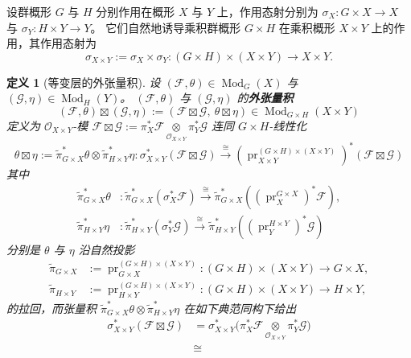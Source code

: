 \documentclass[11pt,a4paper]{article}
\renewcommand{\emph}[1]{{\bfseries #1}}
\DeclareMathOperator{\Mod}{\mathrm{Mod}}
\DeclareMathOperator{\pr}{\operatorname{pr}}
\theoremstyle{cnth}
\newtheorem{defn}[thm]{定义}
\begin{document}
设群概形 $G$ 与 $H$ 分别作用在概形 $X$ 与 $Y$ 上，作用态射分别为
$\sigma_X : G \times X \rightarrow X$
与
$\sigma_Y : H \times Y \rightarrow Y$。
它们自然地诱导乘积群概形 $G\times H$ 在乘积概形 $X\times Y$ 上的作用，其作用态射为
$$
\sigma_{X\times Y}
:=
\sigma_X\times \sigma_Y
:
(G\times H)\times (X\times Y)
\rightarrow
X\times Y.
$$
\begin{defn}[等变层的外张量积]
\label{defn:ExternalTensorProductOfEquivariantModules}
设 $(\mathcal{F},\theta)\in\Mod_G(X)$ 与
$(\mathcal{G},\eta)\in\Mod_H(Y)$。
$(\mathcal{F},\theta)$ 与 $(\mathcal{G},\eta)$ 的\emph{外张量积}
$$
(\mathcal{F},\theta)\boxtimes(\mathcal{G},\eta)
:=
\left(
\mathcal{F}\boxtimes\mathcal{G},
\
\theta\boxtimes\eta
\right)
\in\Mod_{G\times H}(X\times Y)
$$
定义为 $\mathcal{O}_{X\times Y}$-模
$
\mathcal{F}\boxtimes\mathcal{G}
:=
\pi_X^*\mathcal{F}
\underset{\mathcal{O}_{X\times Y}}{\otimes}
\pi_Y^*\mathcal{G}
$
连同 $G\times H$-线性化
$$
\theta\boxtimes\eta
:=
\tilde{\pi}_{G\times X}^*\theta\otimes\tilde{\pi}_{H\times Y}^*\eta
:
\sigma_{X\times Y}^*(\mathcal{F}\boxtimes\mathcal{G})
\xrightarrow{\cong}
\left(\pr_{X\times Y}^{(G\times H)\times(X\times Y)}\right)^*
(\mathcal{F}\boxtimes\mathcal{G})
$$
其中
\begin{align*}
\tilde{\pi}_{G\times X}^*\theta
&:
\tilde{\pi}_{G\times X}^*(\sigma_X^*\mathcal{F})
\xrightarrow{\cong}
\tilde{\pi}_{G\times X}^*\left(\left(\pr_X^{G\times X}\right)^{\ast}\mathcal{F}\right),
\\[2mm]
\tilde{\pi}_{H\times Y}^*\eta
&:
\tilde{\pi}_{H\times Y}^*(\sigma_Y^*\mathcal{G})
\xrightarrow{\cong}
\tilde{\pi}_{H\times Y}^*\left(\left(\pr_Y^{H\times Y}\right)^*\mathcal{G}\right)
\end{align*}
分别是 $\theta$ 与 $\eta$ 沿自然投影
\begin{align*}
\tilde{\pi}_{G\times X}
&:=
\pr_{G\times X}^{(G\times H)\times(X\times Y)}
:
(G\times H)\times(X\times Y)
\rightarrow
G\times X,
\\[2mm]
\tilde{\pi}_{H\times Y}
&:=
\pr_{H\times Y}^{(G\times H)\times(X\times Y)}
:
(G\times H)\times(X\times Y)
\rightarrow
H\times Y,
\end{align*}
的拉回，而张量积
$
\tilde{\pi}_{G\times X}^*\theta\otimes\tilde{\pi}_{H\times Y}^*\eta
$
在如下典范同构下给出
\begin{align*}
\sigma_{X\times Y}^*(\mathcal{F}\boxtimes\mathcal{G})
&=
\sigma_{X\times Y}^*
\Big(
\pi_X^*\mathcal{F}
\underset{\mathcal{O}_{X\times Y}}{\otimes}
\pi_Y^*\mathcal{G}
\Big)
\\[2mm]
&\cong

\end{align*}
\end{defn}
\end{document}
